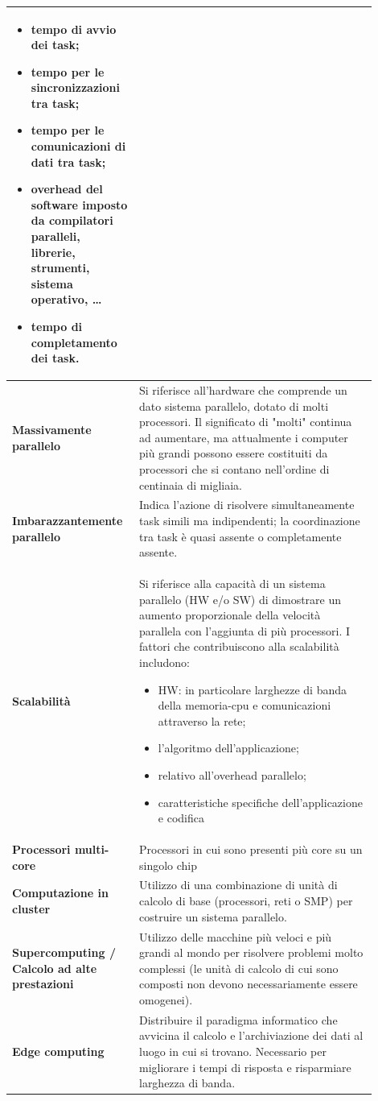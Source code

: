 \begin{longtable}{|m{0.28\linewidth}|m{0.62\linewidth}|}
		\begin{itemize}
			\item tempo di avvio dei task;
			\item tempo per le sincronizzazioni tra task;
			\item tempo per le comunicazioni di dati tra task;
			\item overhead del software imposto da compilatori paralleli, librerie, strumenti, sistema operativo, \dots
			\item tempo di completamento dei task.
		\end{itemize}
		\\
		\hline
		\textbf{Massivamente parallelo} &  Si riferisce all'hardware che comprende un dato sistema parallelo, dotato di molti processori. Il significato di "molti" continua ad aumentare, ma attualmente i computer più grandi possono essere costituiti da processori che si contano nell'ordine di centinaia di migliaia.
		\\
		\hline
		\textbf{Imbarazzantemente parallelo} & Indica l'azione di risolvere simultaneamente task simili ma indipendenti; la coordinazione tra task è quasi assente o completamente assente.
		\\
		\hline
		\textbf{Scalabilità} & Si riferisce alla capacità di un sistema parallelo (HW e/o SW) di dimostrare un aumento proporzionale della velocità parallela con l'aggiunta di più processori. I fattori che contribuiscono alla scalabilità includono:
		\begin{itemize}
			\item HW: in particolare larghezze di banda della memoria-cpu e comunicazioni attraverso la rete;
			\item l'algoritmo dell'applicazione;
			\item relativo all'overhead parallelo;
			\item caratteristiche specifiche dell'applicazione e codifica
		\end{itemize}
		\\
		\hline
		\textbf{Processori multi-core} & Processori in cui sono presenti più core su un singolo chip
		\\
		\hline
		\textbf{Computazione in cluster} & Utilizzo di una combinazione di unità di calcolo di base (processori, reti o SMP) per costruire un sistema parallelo.
		\\
		\hline
		\textbf{Supercomputing / Calcolo ad alte prestazioni} & Utilizzo delle macchine più veloci e più grandi al mondo per risolvere problemi molto complessi (le unità di calcolo di cui sono composti non devono necessariamente essere omogenei).
		\\
		\hline
		\textbf{Edge computing} & Distribuire il paradigma informatico che avvicina il calcolo e l'archiviazione dei dati al luogo in cui si trovano. Necessario per migliorare i tempi di risposta e risparmiare larghezza di banda.
		\\
		\hline
	\end{longtable}
